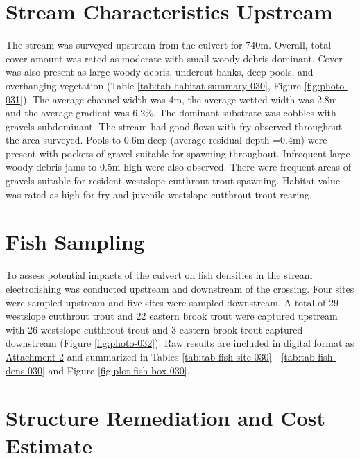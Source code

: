 \documentclass[
]{book}
\begin{document}
\hypertarget{stream-characteristics-upstream-2}{%
\section*{Stream Characteristics Upstream}\label{stream-characteristics-upstream-2}}

The stream was surveyed upstream from the culvert for 740m. Overall, total cover amount was rated as moderate with small woody debris dominant. Cover was also present as large woody debris, undercut banks, deep pools, and overhanging vegetation (Table \ref{tab:tab-habitat-summary-030}, Figure \ref{fig:photo-031}). The average channel width was 4m, the average wetted width was 2.8m and the average gradient was 6.2\%. The dominant substrate was cobbles with gravels subdominant. The stream had good flows with fry observed throughout the area surveyed. Pools to 0.6m deep (average residual depth =0.4m) were present with pockets of gravel suitable for spawning throughout. Infrequent large woody debris jams to 0.5m high were also observed. There were frequent areas of gravels suitable for resident westslope cutthrout trout spawning. Habitat value was rated as high for fry and juvenile westslope cutthrout trout rearing.

\hypertarget{fish-sampling-1}{%
\section*{Fish Sampling}\label{fish-sampling-1}}

To assess potential impacts of the culvert on fish densities in the stream electrofishing was conducted upstream and downstream of the crossing. Four sites were sampled upstream and five sites were sampled downstream. A total of 29 westslope cutthrout trout and 22 eastern brook trout were captured upstream with 26 westslope cutthrout trout and 3 eastern brook trout captured downstream (Figure \ref{fig:photo-032}). Raw results are included in digital format as \href{https://github.com/NewGraphEnvironment/fish_passage_elk_2020_reporting/raw/master/data/habitat_confirmations.xls}{Attachment 2} and summarized in Tables \ref{tab:tab-fish-site-030} - \ref{tab:tab-fish-dens-030} and Figure \ref{fig:plot-fish-box-030}.

\hypertarget{structure-remediation-and-cost-estimate-2}{%
\section*{Structure Remediation and Cost Estimate}\label{structure-remediation-and-cost-estimate-2}}
\end{document}
